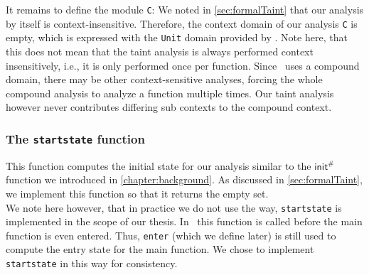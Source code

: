         It remains to define the module \texttt{C}: We noted in \autoref{sec:formalTaint} that our analysis by itself is context-insensitive. Therefore, the context domain of our analysis \texttt{C} is empty, which is expressed with the \texttt{Unit} domain provided by \gob. Note here, that this does not mean that the taint analysis is always performed context insensitively, i.e., it is only performed once per function. Since \gob\ uses a compound domain, there may be other context-sensitive analyses, forcing the whole compound analysis to analyze a function multiple times. Our taint analysis however never contributes differing sub contexts to the compound context.

      \subsubsection{The \texttt{startstate} function}
        This function computes the initial state for our analysis similar to the $\textsf{init}^{\#}$ function we introduced in \autoref{chapter:background}. As discussed in \autoref{sec:formalTaint}, we implement this function so that it returns the empty set.\\
        We note here however, that in practice we do not use the way, \texttt{startstate} is implemented in the scope of our thesis. In \gob\ this function is called before the main function is even entered. Thus, \texttt{enter} (which we define later) is still used to compute the entry state for the main function. We chose to implement \texttt{startstate} in this way for consistency.

